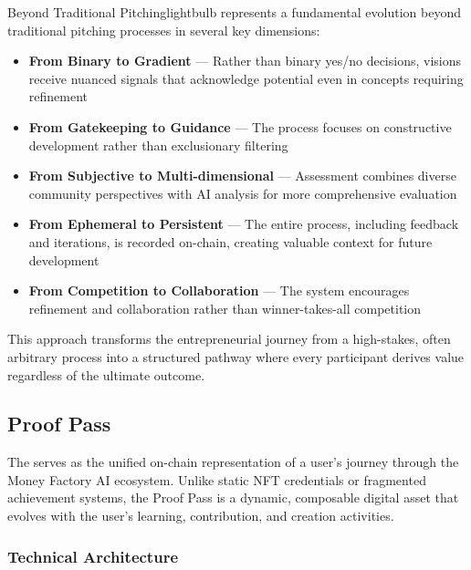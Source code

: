 \begin{mfai-box}{Beyond Traditional Pitching}{lightbulb}
 represents a fundamental evolution beyond traditional pitching processes in several key dimensions:

\begin{itemize}
    \item \textbf{From Binary to Gradient} — Rather than binary yes/no decisions, visions receive nuanced signals that acknowledge potential even in concepts requiring refinement
    
    \item \textbf{From Gatekeeping to Guidance} — The process focuses on constructive development rather than exclusionary filtering
    
    \item \textbf{From Subjective to Multi-dimensional} — Assessment combines diverse community perspectives with AI analysis for more comprehensive evaluation
    
    \item \textbf{From Ephemeral to Persistent} — The entire process, including feedback and iterations, is recorded on-chain, creating valuable context for future development
    
    \item \textbf{From Competition to Collaboration} — The system encourages refinement and collaboration rather than winner-takes-all competition
\end{itemize}

This approach transforms the entrepreneurial journey from a high-stakes, often arbitrary process into a structured pathway where every participant derives value regardless of the ultimate outcome.
\end{mfai-box}

\subsection{Proof Pass\texttrademark}

The  serves as the unified on-chain representation of a user's journey through the Money Factory AI ecosystem. Unlike static NFT credentials or fragmented achievement systems, the Proof Pass is a dynamic, composable digital asset that evolves with the user's learning, contribution, and creation activities.

\subsubsection*{Technical Architecture}

